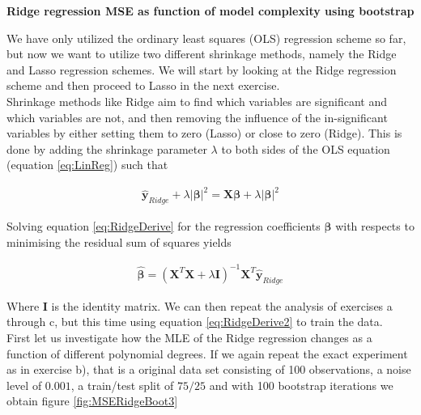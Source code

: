 \documentclass[12pt,a4paper]{article}
\begin{document}
\begin{center}
\large{\textbf{Ridge regression MSE as function of model complexity using bootstrap}}
\end{center}

\noindent We have only utilized the ordinary least squares (OLS) regression scheme so far, but now we want to utilize two different shrinkage methods, namely the Ridge and Lasso regression schemes. We will start by looking at the Ridge regression scheme and then proceed to Lasso in the next exercise. 
\\
Shrinkage methods like Ridge aim to find which variables are significant and which variables are not, and then removing the influence of the in-significant variables by either setting them to zero (Lasso) or close to zero (Ridge). This is done by adding the shrinkage parameter $\lambda$ to both sides of the OLS equation (equation \ref{eq:LinReg}) such that

\begin{equation}\label{eq:RidgeDerive}
\begin{aligned}
\boldsymbol{\hat{y}}_{Ridge} + \lambda |\boldsymbol{\beta}|^2 = \textbf{X}\boldsymbol{\beta} + \lambda  |\boldsymbol{\beta}|^2
\end{aligned}
\end{equation}

\noindent Solving equation \ref{eq:RidgeDerive} for the regression coefficients $\boldsymbol{\beta}$ with respects to minimising the residual sum of squares yields

\begin{equation}\label{eq:RidgeDerive2}
\begin{aligned}
\boldsymbol{\hat{\beta}} = (\textbf{X}^T \textbf{X} + \lambda \textbf{I})^{-1} \textbf{X}^T \boldsymbol{\hat{y}}_{Ridge}
\end{aligned}
\end{equation}

\noindent Where $\textbf{I}$ is the identity matrix. We can then repeat the analysis of exercises a through c, but this time using equation \ref{eq:RidgeDerive2} to train the data. 
\\
First let us investigate how the MLE of the Ridge regression changes as a function of different polynomial degrees. If we again repeat the exact experiment as in exercise b), that is a original data set consisting of 100 observations, a noise level of $0.001$, a train/test split of $75/25$ and with 100 bootstrap iterations we obtain figure \ref{fig:MSERidgeBoot3}
\end{document}
